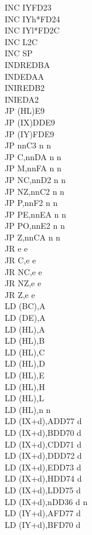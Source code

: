\documentclass[oneside,a4paper]{book}
\begin{document}
\begin{multicols}{3}
{\begin{tabbing}
INC IY\>FD23\\
INC IYh*\>FD24\\
INC IYl*\>FD2C\\
INC L\>2C\\
INC SP\\
INDR\>EDBA\\
IND\>EDAA\\
INIR\>EDB2\\
INI\>EDA2\\
JP (HL)\>E9\\
JP (IX)\>DDE9\\
JP (IY)\>FDE9\\
JP nn\>C3 n n\\
JP C,nn\>DA n n\\
JP M,nn\>FA n n\\
JP NC,nn\>D2 n n\\
JP NZ,nn\>C2 n n\\
JP P,nn\>F2 n n\\
JP PE,nn\>EA n n\\
JP PO,nn\>E2 n n\\
JP Z,nn\>CA n n\\
JR e e\\
JR C,e e\\
JR NC,e e\\
JR NZ,e e\\
JR Z,e e\\
LD (BC),A\\
LD (DE),A\\
LD (HL),A\\
LD (HL),B\\
LD (HL),C\\
LD (HL),D\\
LD (HL),E\\
LD (HL),H\\
LD (HL),L\\
LD (HL),n n\\
LD (IX+d),A\>DD77 d\\
LD (IX+d),B\>DD70 d\\
LD (IX+d),C\>DD71 d\\
LD (IX+d),D\>DD72 d\\
LD (IX+d),E\>DD73 d\\
LD (IX+d),H\>DD74 d\\
LD (IX+d),L\>DD75 d\\
LD (IX+d),n\>DD36 d n\\
LD (IY+d),A\>FD77 d\\
LD (IY+d),B\>FD70 d\\

\end{tabbing}}
\end{multicols}
\end{document}

